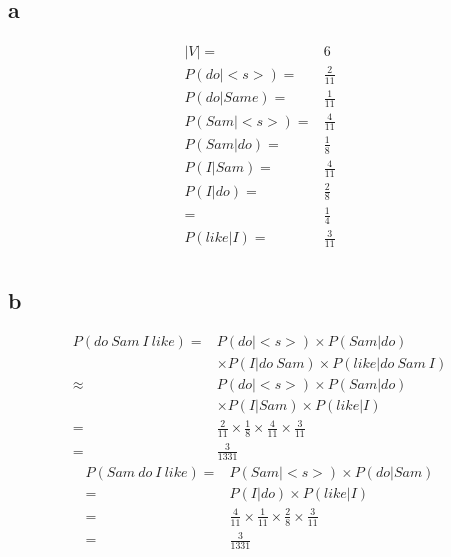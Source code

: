 \documentclass{article}
\begin{document}
    \subsection*{a}
    \begin{equation*}
        \begin{split}
            |V|=&6\\
            P(do|<s>)=&\frac{2}{11}\\
            P(do|Same)=&\frac{1}{11}\\
            P(Sam|<s>)=&\frac{4}{11}\\
            P(Sam|do)=&\frac{1}{8}\\
            P(I|Sam)=&\frac{4}{11}\\
            P(I|do)=&\frac{2}{8}\\
                    =&\frac{1}{4}\\
            P(like|I)=&\frac{3}{11}\\
        \end{split}
    \end{equation*}
    \subsection*{b}
    \begin{equation*}
        \begin{split}
            P(do \ Sam \ I \ like)=&P(do|<s>)\times P(Sam|do)\\
                            &\times P(I|do\ Sam)\times P(like|do\ Sam\ I)\\
                            \approx&P(do|<s>)\times P(Sam|do)\\
                            &\times P(I|Sam)\times P(like|I)\\
                            =&\frac{2}{11}\times\frac{1}{8}\times\frac{4}{11}\times\frac{3}{11}\\
                            =&\frac{3}{1331}
        \end{split}
    \end{equation*}
    \begin{equation*}
        \begin{split}
            P(Sam \ do\  I \ like)=&P(Sam|<s>)\times P(do|Sam)\\
                                =&P(I|do)\times P(like|I)\\
                                =&\frac{4}{11}\times\frac{1}{11}\times\frac{2}{8}\times\frac{3}{11}\\
                                =&\frac{3}{1331}
        \end{split}
    \end{equation*}
\end{document}
